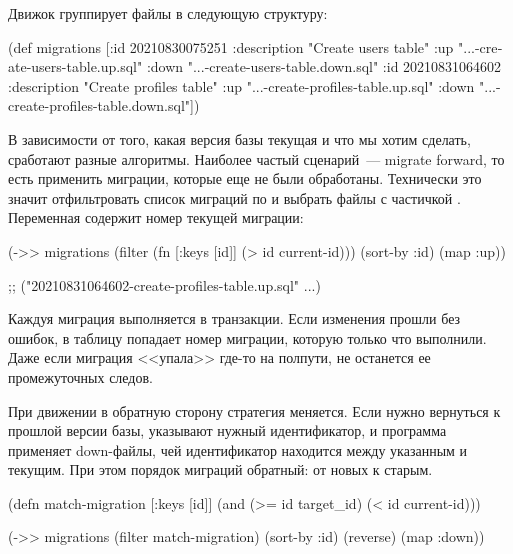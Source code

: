 Движок группирует файлы в следующую структуру:

\begin{english}
  \begin{clojure}
(def migrations
  [{:id 20210830075251
    :description "Create users table"
    :up "...-create-users-table.up.sql"
    :down "...-create-users-table.down.sql"}
   {:id 20210831064602
    :description "Create profiles table"
    :up "...-create-profiles-table.up.sql"
    :down "...-create-profiles-table.down.sql"}])
  \end{clojure}
\end{english}

В зависимости от того, какая версия базы текущая и что мы хотим сделать, сработают разные алгоритмы. Наиболее частый сценарий~--- migrate forward, то есть применить миграции, которые еще не были обработаны. Технически это значит отфильтровать список миграций по  и выбрать файлы с частичкой . Переменная   содержит номер текущей миграции:

\begin{english}
  \begin{clojure/lines}
(->> migrations
     (filter (fn [{:keys [id]}]
               (> id current-id)))
     (sort-by :id)
     (map :up))

;; ("20210831064602-create-profiles-table.up.sql" ...)
  \end{clojure/lines}
\end{english}

Каждуя миграция выполняется в транзакции. Если изменения прошли без ошибок, в таблицу  попадает номер миграции, которую только что выполнили. Даже если миграция <<упала>> где-то на полпути, не останется ее промежуточных следов.

При движении в обратную сторону стратегия меняется. Если нужно вернуться к прошлой версии базы, указывают нужный идентификатор, и программа применяет down-файлы, чей идентификатор находится между указанным и текущим. При этом порядок миграций обратный: от новых к старым.

\begin{english}
  \begin{clojure}
(defn match-migration
  [{:keys [id]}]
  (and
    (>= id target_id)
    (< id current-id)))

(->> migrations
     (filter match-migration)
     (sort-by :id)
     (reverse)
     (map :down))
  \end{clojure}
\end{english}

